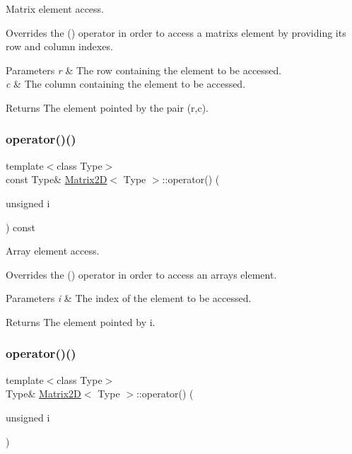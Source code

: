Matrix element access. 

Overrides the \textquotesingle{}()\textquotesingle{} operator in order to access a matrix\textquotesingle{}s element by providing its row and column indexes. 
\begin{DoxyParams}{Parameters}
{\em r} & The row containing the element to be accessed. \\
\hline
{\em c} & The column containing the element to be accessed. \\
\hline
\end{DoxyParams}
\begin{DoxyReturn}{Returns}
The element pointed by the pair (r,c). 
\end{DoxyReturn}
\mbox{\label{classMatrix2D_ac5b60589d9d867150e045887aaebe5b0}} 
\subsubsection{\texorpdfstring{operator()()}{operator()()}\hspace{0.1cm}{\footnotesize\ttfamily [3/4]}}
{\footnotesize\ttfamily template$<$class Type$>$ \\
const Type\& \hyperlink{classMatrix2D}{Matrix2D}$<$ Type $>$\+::operator() (\begin{DoxyParamCaption}\item[{unsigned}]{i }\end{DoxyParamCaption}) const\hspace{0.3cm}{\ttfamily [inline]}}



Array element access. 

Overrides the \textquotesingle{}()\textquotesingle{} operator in order to access an array\textquotesingle{}s element. 
\begin{DoxyParams}{Parameters}
{\em i} & The index of the element to be accessed. \\
\hline
\end{DoxyParams}
\begin{DoxyReturn}{Returns}
The element pointed by i. 
\end{DoxyReturn}
\mbox{\label{classMatrix2D_afebec0a3fc73a157fe8044416fb6d0b3}} 
\subsubsection{\texorpdfstring{operator()()}{operator()()}\hspace{0.1cm}{\footnotesize\ttfamily [4/4]}}
{\footnotesize\ttfamily template$<$class Type$>$ \\
Type\& \hyperlink{classMatrix2D}{Matrix2D}$<$ Type $>$\+::operator() (\begin{DoxyParamCaption}\item[{unsigned}]{i }\end{DoxyParamCaption})\hspace{0.3cm}{\ttfamily [inline]}}




